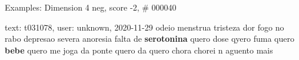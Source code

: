 \begin{frame}{Examples: Dimension 4 neg, score -2, \# 000040}
\footnotesize
\begin{alertblock}{text: t031078, user: unknown, 2020-11-29}
odeio menstrua tristeza dor fogo no rabo depresao severa anoresia falta de 
\textbf{serotonina} quero dose qyero fuma quero \textbf{bebe} quero me joga da 
ponte quero da quero chora chorei n aguento mais 
\end{alertblock}
\end{frame}
